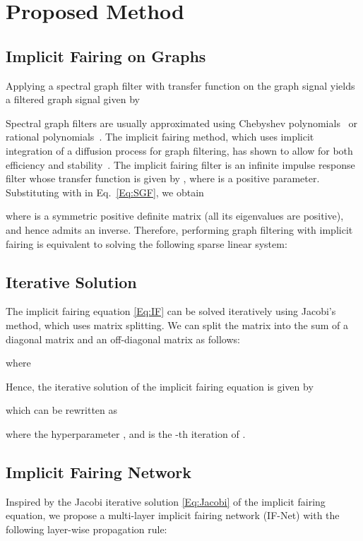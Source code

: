 \documentclass{bmvc2k}
\begin{document}
\section{Proposed Method}
\subsection{Implicit Fairing on Graphs}
Applying a spectral graph filter with transfer function  on the graph signal  yields a filtered graph signal  given by

Spectral graph filters are usually approximated using Chebyshev polynomials~\cite{Taubin:96,Hammond:11,Defferrard:16} or rational polynomials~\cite{Levie:18,Wijesinghe:19}. The implicit fairing method, which uses implicit integration of a diffusion process for graph filtering, has shown to allow for both efficiency and stability~\cite{Desbrun:99}. The implicit fairing filter is an infinite impulse response filter whose transfer function is given by , where  is a positive parameter. Substituting  with  in Eq.~\eqref{Eq:SGF}, we obtain

where  is a symmetric positive definite matrix (all its eigenvalues are positive), and hence admits an inverse. Therefore, performing graph filtering with implicit fairing is equivalent to solving the following sparse linear system:


\subsection{Iterative Solution}
The implicit fairing equation \eqref{Eq:IF} can be solved iteratively using Jacobi's method, which uses matrix splitting. We can split the matrix  into the sum of a diagonal matrix and an off-diagonal matrix as follows:

where

Hence, the iterative solution of the implicit fairing equation is given by

which can be rewritten as

where the hyperparameter , and  is the -th iteration of .

\subsection{Implicit Fairing Network}
Inspired by the Jacobi iterative solution \eqref{Eq:Jacobi} of the implicit fairing equation, we propose a multi-layer implicit fairing network (IF-Net) with the following layer-wise propagation rule:
\end{document}
